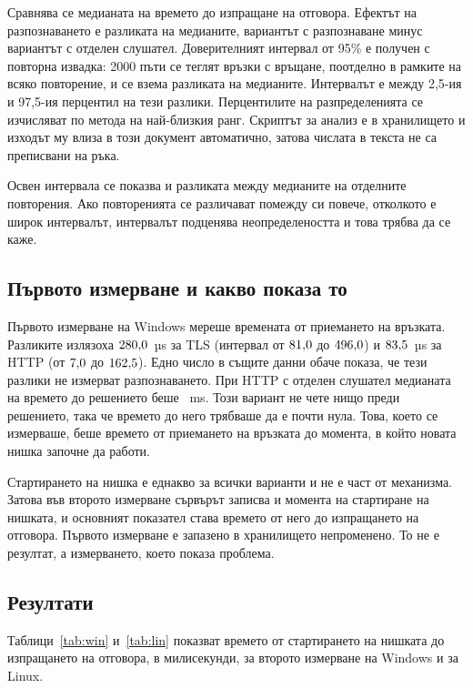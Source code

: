 Сравнява се медианата на времето до изпращане на отговора. Ефектът на разпознаването е
разликата на медианите, вариантът с разпознаване минус вариантът с отделен слушател.
Доверителният интервал от 95\% е получен с повторна извадка: 2000 пъти се теглят връзки
с връщане, поотделно в рамките на всяко повторение, и се взема разликата на медианите.
Интервалът е между 2,5-ия и 97,5-ия перцентил на тези разлики. Перцентилите на
разпределенията се изчисляват по метода на най-близкия ранг. Скриптът за анализ е в
хранилището и изходът му влиза в този документ автоматично, затова числата в текста не
са преписвани на ръка.

Освен интервала се показва и разликата между медианите на отделните повторения. Ако
повторенията се различават помежду си повече, отколкото е широк интервалът, интервалът
подценява неопределеността и това трябва да се каже.

\subsection{Първото измерване и какво показа то}

Първото измерване на Windows мереше времената от приемането на връзката. Разликите
излязоха $280{,}0$~µs за TLS (интервал от $81{,}0$ до
$496{,}0$) и $83{,}5$~µs за HTTP (от $7{,}0$ до
$162{,}5$). Едно число в същите данни обаче показа, че тези разлики не
измерват разпознаването. При HTTP с отделен слушател медианата на времето до решението
беше \winfirstClearDedicatedDecideMedian{}~ms. Този вариант не чете нищо преди
решението, така че времето до него трябваше да е почти нула. Това, което се измерваше,
беше времето от приемането на връзката до момента, в който новата нишка започне да
работи.

Стартирането на нишка е еднакво за всички варианти и не е част от механизма. Затова във
второто измерване сървърът записва и момента на стартиране на нишката, и основният
показател става времето от него до изпращането на отговора. Първото измерване е запазено
в хранилището непроменено. То не е резултат, а измерването, което показа проблема.

\subsection{Резултати}

Таблици~\ref{tab:win} и~\ref{tab:lin} показват времето от стартирането на нишката до
изпращането на отговора, в милисекунди, за второто измерване на Windows и за Linux.

